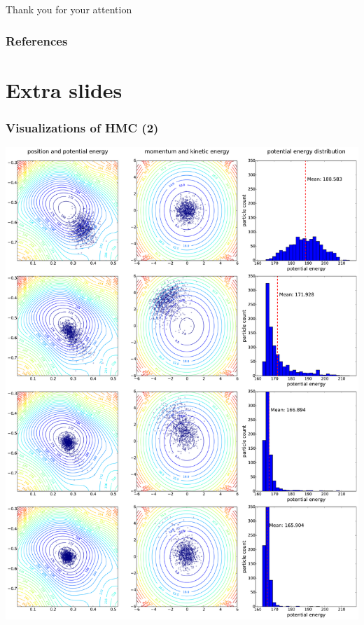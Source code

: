 \documentclass{beamer}
\begin{document}
\begin{frame}[plain]
\Huge{\centerline{Thank you for your attention}}
\end{frame}

\begin{frame}[plain]
\frametitle{References}
\printbibliography{}
\end{frame}

\section{Extra slides}

\begin{frame}[noframenumbering]
	\frametitle{Visualizations of HMC (2)}
	\centering
	\includegraphics[width=\textwidth]{figures/hmcvi_distrib_example_top.pdf}
\end{frame}	
\end{document}
